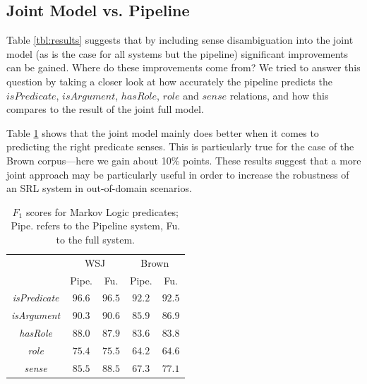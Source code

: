 

\subsection{Joint Model vs. Pipeline}
Table \ref{tbl:results} suggests that by including sense disambiguation into the joint model (as is the case for all systems but the pipeline) significant improvements can be gained. Where do these improvements come from? We tried to answer this question by taking a closer look at how accurately the pipeline predicts the $isPredicate$, $isArgument$, $hasRole$, $role$ and $sense$ relations, and how this compares to the result of the joint full model.

Table \ref{tbl:predicates} shows that the joint model mainly does better when it comes to predicting the right predicate senses. This is particularly true for the case of the Brown corpus---here we gain about 10\% points. These results suggest that a more joint approach may be particularly useful in order to increase the robustness of an SRL system in out-of-domain scenarios.  


\begin{table}[ht]

    \centering
    \begin{tabular}{|c|c|c|c|c|}\hline
      & \multicolumn{2}{c|}{WSJ} & \multicolumn{2}{c|}{Brown}\\
                                  & Pipe.  &  Fu.   & Pipe.  &  Fu. \\\hline 
        \emph{isPredicate}        & $96.6$ & $96.5$ & $92.2$ & $92.5$\\
        \emph{isArgument}         & $90.3$ & $90.6$ & $85.9$ & $86.9$ \\
        \emph{hasRole}            & $88.0$ & $87.9$ & $83.6$ & $83.8$ \\
        \emph{role}               & $75.4$ & $75.5$ & $64.2$ & $64.6$ \\
        \emph{sense}              & $85.5$ & $88.5$ & $67.3$ & $77.1$ \\\hline
    \end{tabular}
    \caption{$F_1$ scores for Markov Logic predicates; Pipe. refers to the Pipeline system, Fu. to the full system.}
    \label{tbl:predicates}
\end{table}


